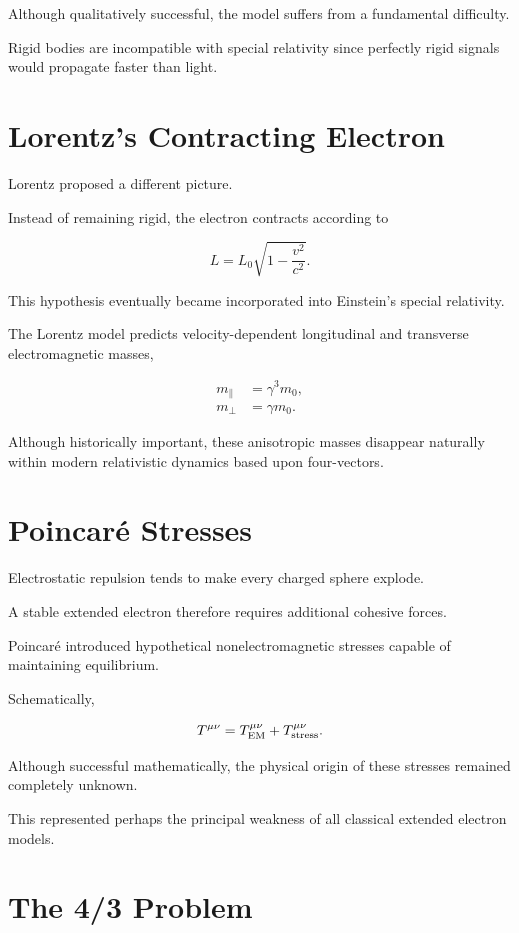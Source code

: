Although qualitatively successful, the model suffers from a fundamental
difficulty.

Rigid bodies are incompatible with special relativity since perfectly rigid
signals would propagate faster than light.\section{Lorentz's Contracting Electron}

Lorentz proposed a different picture.

Instead of remaining rigid, the electron contracts according to

\begin{equation}
L
=
L_0
\sqrt{1-\frac{v^2}{c^2}}.
\end{equation}

This hypothesis eventually became incorporated into Einstein's special
relativity.

The Lorentz model predicts velocity-dependent longitudinal and transverse
electromagnetic masses,

\begin{align}
m_\parallel
&=
\gamma^3m_0,
\\
m_\perp
&=
\gamma m_0.
\end{align}

Although historically important, these anisotropic masses disappear naturally
within modern relativistic dynamics based upon four-vectors.
\section{Poincaré Stresses}

Electrostatic repulsion tends to make every charged sphere explode.

A stable extended electron therefore requires additional cohesive forces.

Poincaré introduced hypothetical nonelectromagnetic stresses capable of
maintaining equilibrium.

Schematically,

\begin{equation}
T^{\mu\nu}
=
T_{\rm EM}^{\mu\nu}
+
T_{\rm stress}^{\mu\nu}.
\end{equation}

Although successful mathematically, the physical origin of these stresses
remained completely unknown.

This represented perhaps the principal weakness of all classical extended
electron models.\section{The 4/3 Problem}

